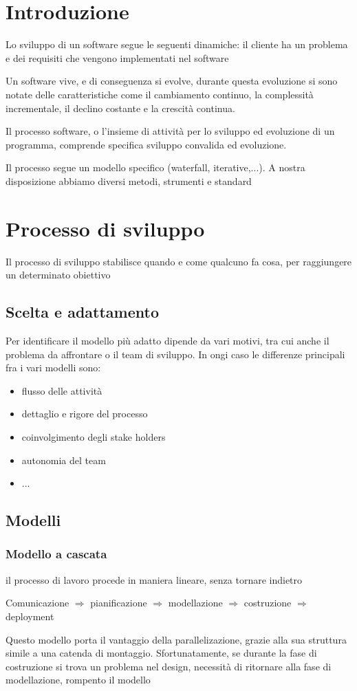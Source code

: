\documentclass[12pt, a4paper]{article}
\begin{document}
\section{Introduzione}
Lo sviluppo di un software segue le seguenti dinamiche: il cliente ha  un problema e dei requisiti che 
vengono implementati nel software

Un software vive, e di conseguenza si evolve, durante questa evoluzione si sono notate delle 
caratteristiche come il cambiamento continuo, la complessità incrementale, il declino costante e la 
crescità continua. 

Il processo software, o l'insieme di attività per lo sviluppo ed evoluzione di un programma, comprende 
specifica sviluppo convalida ed evoluzione. 

Il processo segue un modello specifico (waterfall, iterative,...). A nostra disposizione abbiamo diversi 
metodi, strumenti e standard

\newpage
\section{Processo di sviluppo}
Il processo di sviluppo stabilisce quando e come qualcuno fa cosa, per raggiungere un determinato obiettivo

\subsection{Scelta e adattamento}
Per identificare il modello più adatto dipende da vari motivi, tra cui anche il problema da affrontare o il team di 
sviluppo. In ongi caso le differenze principali fra i vari modelli sono: 
\begin{itemize}
    \item flusso delle attività
    \item dettaglio e rigore del processo
    \item coinvolgimento degli stake holders
    \item autonomia del team
    \item ...
\end{itemize}

\subsection{Modelli}
\subsubsection{Modello a cascata}
il processo di lavoro procede in maniera lineare, senza tornare indietro 
\begin{center}
    Comunicazione $\Rightarrow$ pianificazione $\Rightarrow$ modellazione $\Rightarrow$ costruzione 
    $\Rightarrow$ deployment
\end{center}
Questo modello porta il vantaggio della parallelizazione, grazie alla sua struttura simile a una catenda di montaggio.
Sfortunatamente, se durante la fase di costruzione si trova un problema nel design, necessità di ritornare alla 
fase di modellazione, rompento il modello
\end{document}
